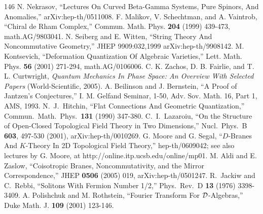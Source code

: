 \begin{thebibliography}{146}
 N. Nekrasov, ``Lectures On Curved Beta-Gamma Systems, Pure Spinors, And Anomalies,'' arXiv:hep-th/0511008.
 F. Malikov, V. Schechtman, and A. Vaintrob, ``Chiral de Rham Complex,'' Commun. Math. Phys. \textbf{204} (1999) 439-473, math.AG/9803041.
 N. Seiberg and E. Witten, ``String Theory And Noncommutative Geometry,'' JHEP 9909:032,1999 arXiv:hep-th/9908142.
 M. Kontsevich, ``Deformation Quantization Of Algebraic Varieties,'' Lett. Math. Phys. \textbf{56} (2001) 271-294, math.AG/0106006.
 C. K. Zachos, D. B. Fairlie, and T. L. Curtwright, \emph{Quantum Mechanics In Phase Space: An Overview With Selected Papers} (World-Scientific, 2005).
 A. Beilinson and J. Bernstein, ``A Proof of Jantzen's Conjectures,'' I. M. Gelfand Seminar, 1-50, Adv. Sov. Math. 16, Part 1, AMS, 1993.
 N.~J.~Hitchin, ``Flat Connections And Geometric Quantization,'' Commun.\ Math.\ Phys.\ \textbf{131} (1990) 347-380.
 C.~I.~Lazaroiu, ``On the Structure of Open-Closed Topological Field Theory in Two Dimensions,'' Nucl.\ Phys.\ B \textbf{603}, 497-530 (2001), arXiv:hep-th/0010269.
 G. Moore and G. Segal, ``$D$-Branes And $K$-Theory In 2D Topological Field Theory,'' hep-th/0609042; see also lectures by G. Moore, at http://online.itp.ucsb.edu/online/mp01.
 M. Aldi and E. Zaslow, ``Coisotropic Branes, Noncommutativity, and the Mirror Correspondence,'' JHEP \textbf{0506} (2005) 019, arXiv:hep-th/0501247.
 R.~Jackiw and C.~Rebbi, ``Solitons With Fermion Number 1/2,'' Phys.\ Rev.\ D \textbf{13} (1976) 3398-3409.
 A. Polishchuk and M. Rothstein, ``Fourier Transform For ${\cal D}$-Algebras,'' Duke Math. J. \textbf{109} (2001) 123-146.
\end{thebibliography}
